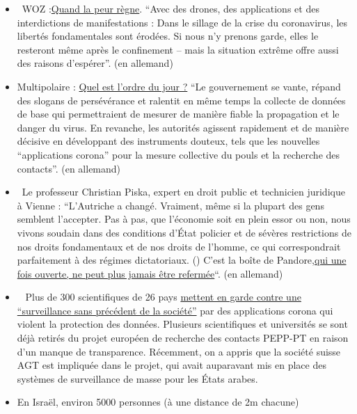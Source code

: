 \begin{itemize}
\tightlist
\item
  ~WOZ
  :\href{https://www.woz.ch/2016/grundrechte/wenn-die-angst-regiert}{Quand
  la peur règne}. ``Avec des drones, des applications et des
  interdictions de manifestations : Dans le sillage de la crise du
  coronavirus, les libertés fondamentales sont érodées. Si nous n'y
  prenons garde, elles le resteront même après le confinement -- mais la
  situation extrême offre aussi des raisons d'espérer''. (en allemand)
\item
  Multipolaire :
  \href{https://multipolar-magazin.de/artikel/die-massnahmen-wirken}{Quel
  est l'ordre du jour ?} ``Le gouvernement se vante, répand des slogans
  de persévérance et ralentit en même temps la collecte de données de
  base qui permettraient de mesurer de manière fiable la propagation et
  le danger du virus. En revanche, les autorités agissent rapidement et
  de manière décisive en développant des instruments douteux, tels que
  les nouvelles ``applications corona'' pour la mesure collective du
  pouls et la recherche des contacts''. (en allemand)
\item
  ~Le professeur Christian Piska, expert en droit public et technicien
  juridique à Vienne : ``L'Autriche a changé. Vraiment, même si la
  plupart des gens semblent l'accepter. Pas à pas, que l'économie soit
  en plein essor ou non, nous vivons soudain dans des conditions d'État
  policier et de sévères restrictions de nos droits fondamentaux et de
  nos droits de l'homme, ce qui correspondrait parfaitement à des
  régimes dictatoriaux. () C'est la boîte de
  Pandore,\href{https://kurier.at/meinung/das-juristische-totschlagargument-vom-menschenleben/400814570}{qui
  une fois ouverte, ne peut plus jamais être refermée}``. (en allemand)
\item
  ~ Plus de 300 scientifiques de 26 pays
  \href{https://www.golem.de/news/corona-app-300-wissenschaftler-warnen-vor-zentraler-datenspeicherung-2004-147973.html}{mettent
  en garde contre une ``surveillance sans précédent de la société''} par
  des applications corona qui violent la protection des données.
  Plusieurs scientifiques et universités se sont déjà retirés du projet
  européen de recherche des contacts PEPP-PT en raison d'un manque de
  transparence. Récemment, on a appris que la société suisse AGT est
  impliquée dans le projet, qui avait auparavant mis en place des
  systèmes de surveillance de masse pour les États arabes.
\item
  En Israël, environ 5000 personnes (à une distance de 2m chacune)

\end{itemize}
